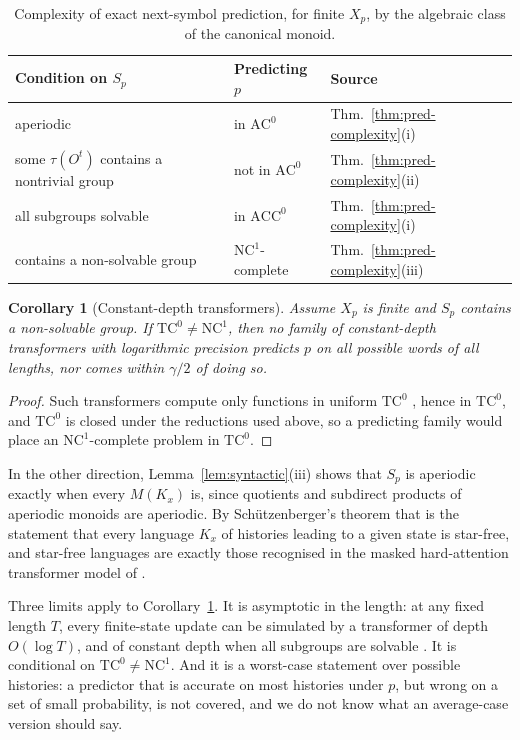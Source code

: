 \documentclass[10pt]{article}
\newtheorem{corollary}[theorem]{Corollary}
\theoremstyle{definition}
\theoremstyle{remark}
\newcommand{\Obs}{O}
\begin{document}
\begin{table}[ht]
\centering
\begin{tabular}{lll}
\hline
Condition on $S_p$ & Predicting $p$ & Source\\
\hline
aperiodic & in $\mathrm{AC}^0$ &
  Thm.~\ref{thm:pred-complexity}(i)\\
some $\tau(\Obs^t)$ contains a nontrivial group &
  not in $\mathrm{AC}^0$ & Thm.~\ref{thm:pred-complexity}(ii)\\
all subgroups solvable & in $\mathrm{ACC}^0$ &
  Thm.~\ref{thm:pred-complexity}(i)\\
contains a non-solvable group & $\mathrm{NC}^1$-complete &
  Thm.~\ref{thm:pred-complexity}(iii)\\
\hline
\end{tabular}
\caption{Complexity of exact next-symbol prediction, for finite
$X_p$, by the algebraic class of the canonical monoid.}
\label{tab:classes}
\end{table}

\begin{corollary}[Constant-depth transformers]
\label{cor:transformers}
Assume $X_p$ is finite and $S_p$ contains a non-solvable group.  If
$\mathrm{TC}^0\ne\mathrm{NC}^1$, then no family of
constant-depth transformers with logarithmic precision predicts $p$
on all possible words of all lengths, nor comes within $\gamma/2$ of
doing so.
\end{corollary}

\begin{proof}
Such transformers compute only functions in uniform $\mathrm{TC}^0$
\cite{MerrillSabharwal2023}, hence in $\mathrm{TC}^0$, and $\mathrm{TC}^0$ is closed under the
reductions used above, so a predicting family would place an
$\mathrm{NC}^1$-complete problem in $\mathrm{TC}^0$.
\end{proof}

In the other direction, Lemma~\ref{lem:syntactic}(iii) shows that
$S_p$ is aperiodic exactly when every $M(K_x)$ is, since quotients
and subdirect products of aperiodic monoids are aperiodic.  By
Sch\"utzenberger's theorem \cite{Schutzenberger1965} that is the
statement that every language $K_x$ of histories leading to a given
state is star-free, and star-free languages are exactly those
recognised in the masked hard-attention transformer model of
\cite{YangChiangAngluin2024}.

Three limits apply to Corollary~\ref{cor:transformers}.  It is
asymptotic in the length: at any fixed length $T$, every finite-state
update can be simulated by a transformer of depth $O(\log T)$, and
of constant depth when all subgroups are solvable
\cite{LiuEtAl2023}.  It is conditional on
$\mathrm{TC}^0\ne\mathrm{NC}^1$.  And it is a worst-case statement
over possible histories: a predictor that is accurate on most
histories under $p$, but wrong on a set of small probability, is not
covered, and we do not know what an average-case version should say.
\end{document}
